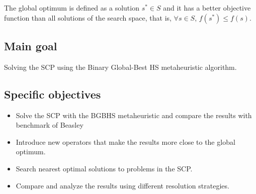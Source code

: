 The global optimum is defined as  a solution $s^* \in S$ and it has a better objective function than all solutions of the search space, that is, $\forall  s \in  S$, $f(s^*) 	\leq f(s)$.\\

\subsection{Main goal}
Solving the SCP using the Binary Global-Best HS metaheuristic algorithm.

\subsection{Specific objectives}
\begin{itemize}
\item Solve the SCP with the BGBHS metaheuristic and compare the results with benchmark of Beasley	\cite{citeulike:921349}	
\item Introduce new operators that make the results more close to the global optimum.
\item Search nearest optimal solutions to problems in the SCP.
\item Compare and analyze the results using different resolution strategies.
\end{itemize}





